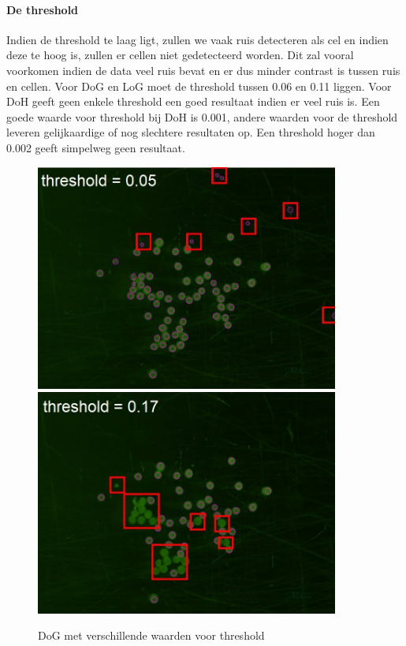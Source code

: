 \documentclass{article}
\begin{document}
\begin{multicols}{2}
\paragraph{De threshold}
Indien de threshold te laag ligt, zullen we vaak ruis detecteren als cel en indien deze te hoog is, zullen er cellen niet gedetecteerd worden. Dit zal vooral voorkomen indien de data veel ruis bevat en er dus minder contrast is tussen ruis en cellen. Voor DoG en LoG moet de threshold tussen 0.06 en 0.11 liggen. Voor DoH geeft geen enkele threshold een goed resultaat indien er veel ruis is. Een goede waarde voor threshold bij DoH is 0.001, andere waarden voor de threshold leveren gelijkaardige of nog slechtere resultaten op. Een threshold hoger dan 0.002 geeft simpelweg geen resultaat.
\begin{figure}[H]
\centering
\includegraphics[width=0.89\textwidth]{images/low_threshold.jpg}
\includegraphics[width=0.89\textwidth]{images/high_threshhold.jpg}
\caption{\label{fig:compare_threshold}DoG met verschillende waarden voor threshold}
\end{figure}


\end{multicols}
\end{document}
